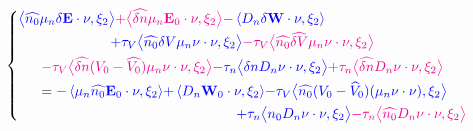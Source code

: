 \documentclass[a4paper,12pt, draft]{article}
\begin{document}
\begin{equation*}
\begin{dcases}
  \begin{multlined}[b][.93\textwidth]
    {\color{blue} \big<\widehat{n_{0}} \mu_n \delta \mathbf{E} \cdot \nu, \xi_{2} \big>}
      {\color{Magenta} + \big< \widehat{\delta n} \mu_n \mathbf{E}_{0} \cdot \nu, \xi_{2} \big>}
      {\color{blue} - \left< D_n \delta \mathbf{W} \cdot \nu, \xi_{2} \right>}\\
    {\color{blue} + \tau_V \big< \widehat{n_0} \delta V \mu_n \nu \cdot \nu, \xi_{2} \big>}
      {\color{Magenta} - \tau_V \big< \widehat{n_0} \widehat{\delta V} \mu_n \nu \cdot \nu,
        \xi_{2}\big>}\\
    {\color{Magenta}-\tau_V\big<\widehat{\delta n} (V_0-\widehat{V_0})
        \mu_n\nu\cdot\nu,\xi_{2}\big>}
      {\color{blue} - \tau_n \big< \delta n D_n \nu \cdot \nu, \xi_{2} \big>}
      {\color{Magenta} + \tau_n \big<\widehat{\delta n} D_n \nu \cdot \nu, \xi_{2} \big>} \\
    = {\color{blue} - \left<\mu_n \widehat{n_{0}} \mathbf{E}_{0} \cdot \nu, \xi_{2} \right>}
      {\color{blue} + \left<D_n \mathbf{W}_{0} \cdot \nu, \xi_{2} \right>}
      {\color{blue} - \tau_V \big<\widehat{n_0} (V_0 -\widehat{V}_0)(\mu_n \nu \cdot \nu),
        \xi_{2}\big>} \\
    {\color{blue} + \tau_n \big< n_{0}D_n \nu \cdot \nu, \xi_{2} \big>}
      {\color{Magenta} - \tau_n \big<\widehat{n_{0}} D_n \nu \cdot \nu, \xi_{2} \big>}
  \end{multlined}
 \end{dcases}
\end{equation*}
\end{document}
